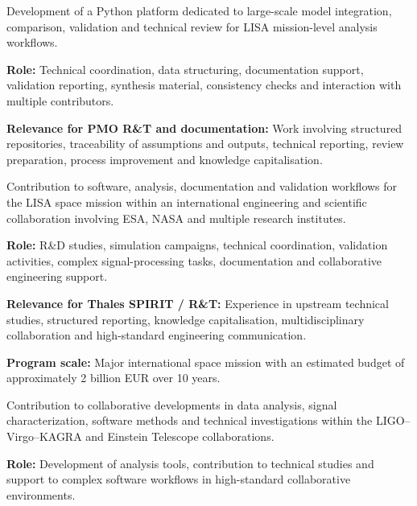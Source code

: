 \documentclass[8pt,a4paper,ragged2e,withhyper]{altacv}
\begin{document}


Development of a Python platform dedicated to large-scale model integration, comparison, validation and technical review for LISA mission-level analysis workflows.

\textbf{Role:} Technical coordination, data structuring, documentation support, validation reporting, synthesis material, consistency checks and interaction with multiple contributors.

\textbf{Relevance for PMO R\&T and documentation:} Work involving structured repositories, traceability of assumptions and outputs, technical reporting, review preparation, process improvement and knowledge capitalisation.

\divider


Contribution to software, analysis, documentation and validation workflows for the LISA space mission within an international engineering and scientific collaboration involving ESA, NASA and multiple research institutes.

\textbf{Role:} R\&D studies, simulation campaigns, technical coordination, validation activities, complex signal-processing tasks, documentation and collaborative engineering support.

\textbf{Relevance for Thales SPIRIT / R\&T:} Experience in upstream technical studies, structured reporting, knowledge capitalisation, multidisciplinary collaboration and high-standard engineering communication.

\textbf{Program scale:} Major international space mission with an estimated budget of approximately 2 billion EUR over 10 years.

\divider


Contribution to collaborative developments in data analysis, signal characterization, software methods and technical investigations within the LIGO--Virgo--KAGRA and Einstein Telescope collaborations.

\textbf{Role:} Development of analysis tools, contribution to technical studies and support to complex software workflows in high-standard collaborative environments.
\end{document}

